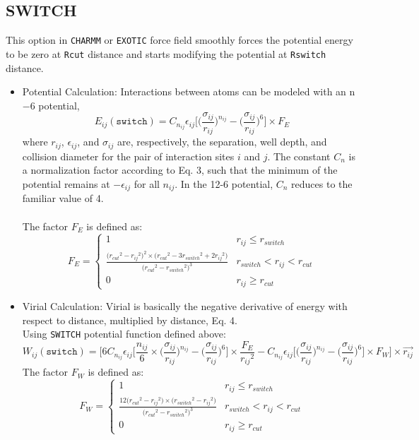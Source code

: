 \subsection{SWITCH} This option in \texttt{CHARMM} or \texttt{EXOTIC} force field smoothly forces the potential energy to be zero at \texttt{Rcut} distance and starts modifying the potential at \texttt{Rswitch} distance.
\begin{itemize}
	\item Potential Calculation: Interactions between atoms can be modeled with an n$-$6 potential,
	\begin{equation}
E_{ij}(\texttt{switch}) = C_{n_{ij}} \epsilon_{ij} \bigg[\bigg(\frac{\sigma_{ij}}{r_{ij}}\bigg)^{n_{ij}} - \bigg(\frac{\sigma_{ij}}{r_{ij}}\bigg)^6\bigg]\times F_E
	\end{equation}
	where $r_{ij}$, $\epsilon_{ij}$, and $\sigma_{ij}$ are, respectively, the separation, well depth, and collision diameter for the pair of interaction sites $i$ and $j$. The constant $C_n$ is a normalization factor according to Eq. 3, such that the minimum of the potential remains at $-\epsilon_{ij}$ for all $n_{ij}$. In the 12-6 potential, $C_n$ reduces to the familiar value of 4.\\\\
	The factor $F_E$ is defined as:
\[
	F_E = 
	\begin{cases}
		1 & r_{ij} \leq r_{switch} \\
		\frac{\big({r_{cut}}^2 - {r_{ij}}^2 \big)^2 \times \big({r_{cut}}^2 - 3{r_{switch}}^2 + 2{r_{ij}}^2 \big)}{\big({r_{cut}}^2 - {r_{switch}}^2 \big)^3} & r_{switch} < r_{ij} < r_{cut} \\
		0 & r_{ij} \geq r_{cut}
	\end{cases}
\]
\begin{equation}
\end{equation}
	
\item Virial Calculation: Virial is basically the negative derivative of energy with respect to distance, multiplied by distance, Eq. 4.\\
Using \texttt{SWITCH} potential function defined above:
\begin{equation}
W_{ij}(\texttt{switch}) = \Bigg[6 C_{n_{ij}} \epsilon_{ij} \bigg[\frac{n_{ij}}{6} \times \bigg(\frac{\sigma_{ij}}{r_{ij}}\bigg)^{n_{ij}} - \bigg(\frac{\sigma_{ij}}{r_{ij}}\bigg)^6\bigg]\times \frac{F_E}{{r_{ij}}^2}  - C_{n_{ij}} \epsilon_{ij} \bigg[\bigg(\frac{\sigma_{ij}}{r_{ij}}\bigg)^{n_{ij}} - \bigg(\frac{\sigma_{ij}}{r_{ij}}\bigg)^6\bigg] \times F_W \Bigg] \times \overrightarrow{r_{ij}}
\end{equation}
	The factor $F_W$ is defined as:
	\[
	F_W = 
	\begin{cases}
		1 & r_{ij} \leq r_{switch} \\
		\frac{12\big({r_{cut}}^2 - {r_{ij}}^2 \big) \times \big({r_{switch}}^2 - {r_{ij}}^2 \big)}{\big({r_{cut}}^2 - {r_{switch}}^2 \big)^3} & r_{switch} < r_{ij} < r_{cut} \\
		0 & r_{ij} \geq r_{cut}
	\end{cases}
\]
\begin{equation}
\end{equation}
\end{itemize}
